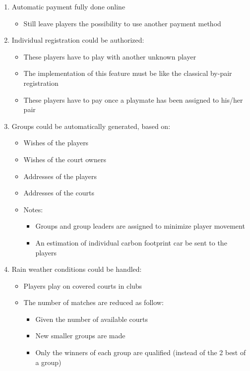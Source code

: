 \begin{enumerate}
	\item Automatic payment fully done online
		\begin{itemize}
			\item Still leave players the possibility to use another payment method
		\end{itemize}
	\item Individual registration could be authorized:
		\begin{itemize}
			\item These players have to play with another unknown player
			\item The implementation of this feature must be like the classical by-pair registration
			\item These players have to pay once a playmate has been assigned to his/her pair
		\end{itemize}
	\item Groups could be automatically generated, based on:
		\begin{itemize}
			\item Wishes of the players
			\item Wishes of the court owners
			\item Addresses of the players
			\item Addresses of the courts
			\item Notes:
				\begin{itemize}
					\item Groups and group leaders are assigned to minimize player movement
					\item An estimation of individual carbon footprint car be sent to the players
				\end{itemize}
		\end{itemize}
	\item Rain weather conditions could be handled:
		\begin{itemize}
			\item Players play on covered courts in clubs
			\item The number of matches are reduced as follow:
				\begin{itemize}
					\item Given the number of available courts
					\item New smaller groups are made
					\item Only the winners of each group are qualified (instead of the 2 best of a group)
				\end{itemize}

\end{itemize}
\end{enumerate}
